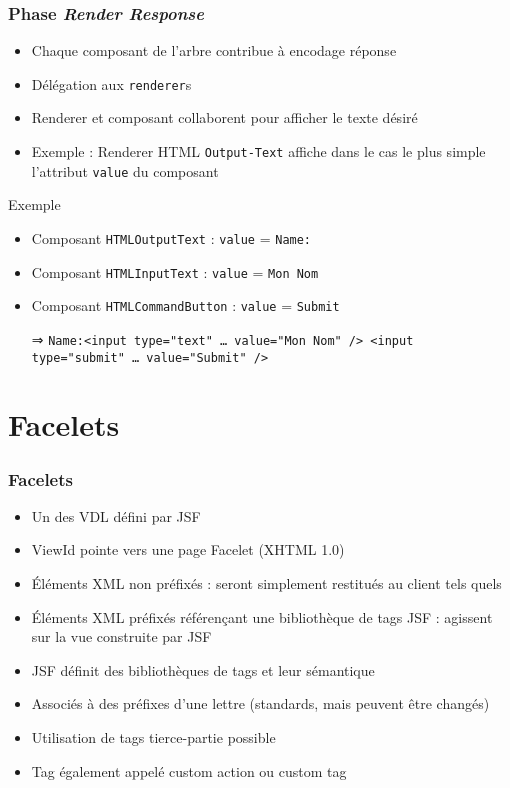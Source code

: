 \documentclass[english, french]{beamer}
\begin{document}
\begin{frame}
	\frametitle{Phase \emph{Render Response}}
	\begin{itemize}
		\item Chaque composant de l’arbre contribue à encodage réponse
		\item Délégation aux \texttt{renderer}s
		\item Renderer et composant collaborent pour afficher le texte désiré
		\item Exemple : Renderer HTML \texttt{Output-Text} affiche {\tiny dans le cas le plus simple} l’attribut \texttt{value} du composant
	\end{itemize}
	\begin{exampleblock}{Exemple}
		\begin{itemize}
			\item Composant \texttt{HTMLOutputText} : \texttt{value} = \texttt{Name:}
			\item Composant \texttt{HTMLInputText} : \texttt{value} = \texttt{Mon Nom}
			\item Composant \texttt{HTMLCommandButton} : \texttt{value} = \texttt{Submit}
			\item[⇒] \texttt{Name:<input type="text" … value="Mon Nom" /> <input type="submit" … value="Submit" />}
		\end{itemize}
	\end{exampleblock}
\end{frame}

\section{Facelets}
\begin{frame}
	\frametitle{Facelets}
	\begin{itemize}
		\item Un des VDL défini par JSF
		\item ViewId pointe vers une page Facelet (XHTML 1.0)
		\item Éléments XML non préfixés : seront simplement restitués au client tels quels
		\item Éléments XML préfixés référençant une bibliothèque de tags JSF : agissent sur la vue construite par JSF
		\item JSF définit des bibliothèques de tags et leur sémantique
		\item Associés à des préfixes d’une lettre {\tiny (standards, mais peuvent être changés)}
		\item Utilisation de tags tierce-partie possible
		\item \tiny Tag également appelé custom action ou custom tag
	\end{itemize}
\end{frame}
\end{document}
